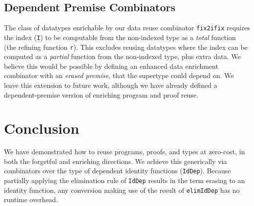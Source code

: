 \documentclass[acmsmall]{acmart}\settopmatter{}
\newcommand{\labsec}[1]{\label{sec:#1}}
\begin{document}
\subsection{Dependent Premise Combinators}

The class of datatypes enrichable by our data reuse combinator \verb;fix2ifix;
requires the index (\verb;I;) to be computable from the non-indexed
type as a \textit{total} function (the refining function
\verb;r;). This excludes reusing datatypes where the index can be
computed as a \textit{partial} function from the non-indexed type,
plus extra data. We believe this would be possible by defining an
enhanced data enrichment combinator with an \textit{erased premise}, that
the supertype could depend on. We leave this extension to future work,
although we have already defined a dependent-premise version of
enriching program and proof reuse.

\section{Conclusion}

We have demonstrated how to reuse programs, proofs, and types at
zero-cost, in both the forgetful and enriching directions. We achieve
this generically via combinators over the type of dependent identity
functions (\verb;IdDep;). Because partially applying the elimination
rule of \verb;IdDep; results in the term erasing to an identity
function, any conversion making use of the result of \verb;elimIdDep;
has no runtime overhead.

\labsec{conc}





\end{document}
